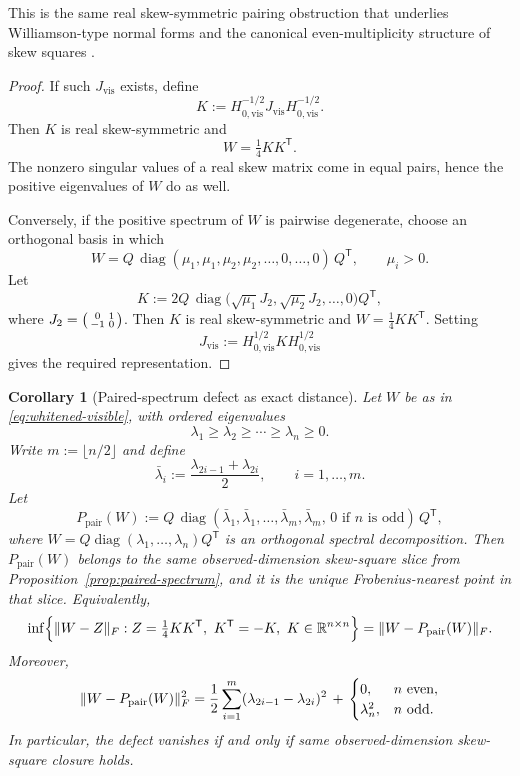 \documentclass[11pt]{article}
\numberwithin{equation}{section}
\DeclarePairedDelimiter{\norm}{\lVert}{\rVert}
\DeclareMathOperator{\diag}{diag}
\theoremstyle{thmcompact}
\newtheorem{corollary}[theorem]{Corollary}
\theoremstyle{remark}
\begin{document}
This is the same real skew-symmetric pairing obstruction that underlies Williamson-type normal forms and the canonical even-multiplicity structure of skew squares \cite{Williamson1936,HornJohnson1991}.

\begin{proof}
If such $J_{\mathrm{vis}}$ exists, define
\[
K:=H_{0,\mathrm{vis}}^{-1/2}J_{\mathrm{vis}}H_{0,\mathrm{vis}}^{-1/2}.
\]
Then $K$ is real skew-symmetric and
\[
W=\tfrac14 K K^{\mathsf T}.
\]
The nonzero singular values of a real skew matrix come in equal pairs, hence the positive eigenvalues of $W$ do as well.

Conversely, if the positive spectrum of $W$ is pairwise degenerate, choose an orthogonal basis in which
\[
W=Q\,\diag(\mu_1,\mu_1,\mu_2,\mu_2,\dots,0,\dots,0)\,Q^{\mathsf T},
\qquad \mu_i>0.
\]
Let
\[
K := 2Q\,\diag\!\bigl(\sqrt{\mu_1}J_2,\sqrt{\mu_2}J_2,\dots,0\bigr)Q^{\mathsf T},
\]
where $J_2=\begin{psmallmatrix}0&1\\-1&0\end{psmallmatrix}$. Then $K$ is real skew-symmetric and $W=\tfrac14 K K^{\mathsf T}$. Setting
\[
J_{\mathrm{vis}}:=H_{0,\mathrm{vis}}^{1/2} K H_{0,\mathrm{vis}}^{1/2}
\]
gives the required representation.
\end{proof}

\begin{corollary}[Paired-spectrum defect as exact distance]\label{cor:paired-defect}
Let $W$ be as in \eqref{eq:whitened-visible}, with ordered eigenvalues
\[
\lambda_1\ge \lambda_2\ge \cdots \ge \lambda_n\ge 0.
\]
Write $m:=\lfloor n/2\rfloor$ and define
\[
\bar\lambda_i:=\frac{\lambda_{2i-1}+\lambda_{2i}}{2},
\qquad i=1,\dots,m.
\]
Let
\begin{equation}\label{eq:pair-projection}
P_{\mathrm{pair}}(W)
:=
Q\,\diag(\bar\lambda_1,\bar\lambda_1,\dots,\bar\lambda_m,\bar\lambda_m,\,0\text{ if }n\text{ is odd})\,Q^{\mathsf T},
\end{equation}
where $W=Q\diag(\lambda_1,\dots,\lambda_n)Q^{\mathsf T}$ is an orthogonal spectral decomposition. Then $P_{\mathrm{pair}}(W)$ belongs to the same observed-dimension skew-square slice from Proposition~\ref{prop:paired-spectrum}, and it is the unique Frobenius-nearest point in that slice. Equivalently,
\begin{equation}\label{eq:paired-defect-distance}
\inf\Bigl\{\norm{W-Z}_F: Z=\tfrac14 K K^{\mathsf T},\ K^{\mathsf T}=-K,\ K\in\mathbb R^{n\times n}\Bigr\}
=
\norm{W-P_{\mathrm{pair}}(W)}_F.
\end{equation}
Moreover,
\begin{equation}\label{eq:paired-defect-formula}
\norm{W-P_{\mathrm{pair}}(W)}_F^2
=
\frac12\sum_{i=1}^{m}(\lambda_{2i-1}-\lambda_{2i})^2
\,+\,
\begin{cases}
0, & n\text{ even},\\
\lambda_n^2, & n\text{ odd}.
\end{cases}
\end{equation}
In particular, the defect vanishes if and only if same observed-dimension skew-square closure holds.
\end{corollary}
\end{document}

